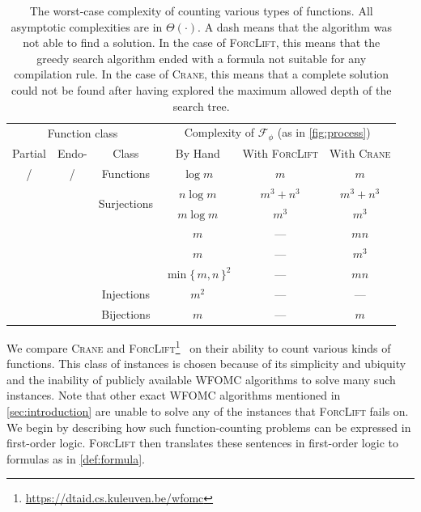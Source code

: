 \documentclass{article}
\newcommand{\cmark}{\ding{51}}%
\newcommand{\xmark}{\ding{55}}%
\begin{document}
\begin{table}[t]
  \centering
  \begin{tabular}{cccccc}
    \toprule
    \multicolumn{3}{c}{Function class} & \multicolumn{3}{c}{Complexity of $\mathcal{F}_{\phi}$ (as in \cref{fig:process})} \\
    Partial & Endo- & Class & By Hand & With \textsc{ForcLift} & With \textsc{Crane} \\
    \midrule
    \rowcolor{gray!25}\cmark/\xmark & \cmark/\xmark & Functions & $\log m$ & $m$ & $m$ \\
    \xmark & \xmark & \multirow{2}{*}{Surjections} & $n \log m$ & $m^{3}+n^{3}$ & $m^{3}+n^{3}$ \\
    \xmark & \cmark & & $m \log m$ & $m^{3}$ & $m^{3}$ \\
    \rowcolor{gray!25}\xmark & \xmark & & $m$ & --- & $mn$ \\
    \rowcolor{gray!25}\xmark & \cmark & & $m$ & --- & $m^3$ \\
    \rowcolor{gray!25}\cmark & \xmark & & ${\min\{\, m, n \,\}}^2$ & --- & $mn$ \\
    \rowcolor{gray!25}\cmark & \cmark & \multirow{-4}{*}{Injections} & $m^2$ & --- & --- \\
    \xmark & \xmark & Bijections & $m$ & --- & $m$ \\
    \bottomrule
  \end{tabular}
  \caption{The worst-case complexity of counting various types of functions. All
    asymptotic complexities are in $\Theta(\cdot)$. A dash means that the
    algorithm was not able to find a solution. In the case of \textsc{ForcLift},
    this means that the greedy search algorithm ended with a formula not
    suitable for any compilation rule. In the case of \textsc{Crane}, this means
    that a complete solution could not be found after having explored the
    maximum allowed depth of the search tree.}\label{tbl:results}
\end{table}

We compare \textsc{Crane} and
\textsc{ForcLift}\footnote{\url{https://dtaid.cs.kuleuven.be/wfomc}}~\cite{DBLP:conf/ijcai/BroeckTMDR11}
on their ability to count various kinds of functions. This class of instances is
chosen because of its simplicity and ubiquity and the inability of publicly
available WFOMC algorithms to solve many such instances. Note that other exact
WFOMC algorithms mentioned in \cref{sec:introduction} are unable to solve any of
the instances that \textsc{ForcLift} fails on. We begin by describing how such
function-counting problems can be expressed in first-order logic.
\textsc{ForcLift} then translates these sentences in first-order logic to
formulas as in \cref{def:formula}.
\end{document}
